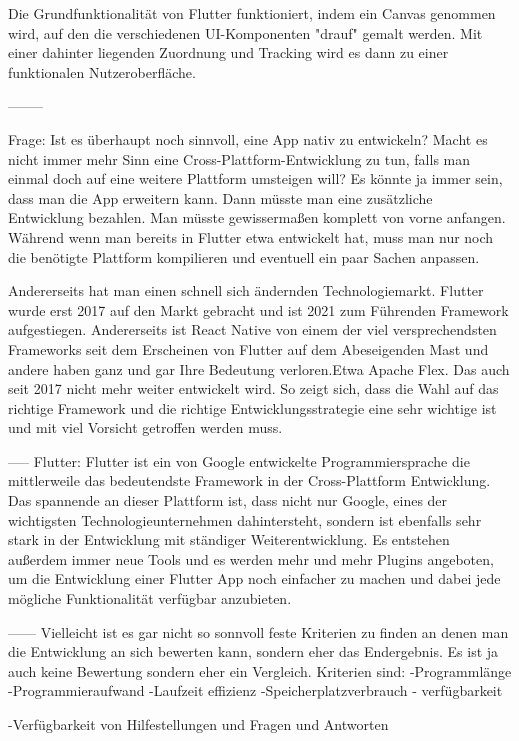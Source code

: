 Die Grundfunktionalität von Flutter funktioniert, indem ein Canvas genommen wird, auf den die verschiedenen UI-Komponenten "drauf" gemalt werden. Mit einer dahinter liegenden Zuordnung und Tracking wird es dann zu einer funktionalen Nutzeroberfläche.

--------

Frage: Ist es überhaupt noch sinnvoll, eine App nativ zu entwickeln? Macht es nicht immer mehr Sinn eine Cross-Plattform-Entwicklung zu tun, falls man einmal doch auf eine weitere Plattform umsteigen will? 
Es könnte ja immer sein, dass man die App erweitern kann. Dann müsste man eine zusätzliche Entwicklung bezahlen. Man müsste gewissermaßen komplett von vorne anfangen. Während wenn man bereits in Flutter etwa entwickelt hat, muss man nur noch die benötigte Plattform kompilieren und eventuell ein paar Sachen anpassen. 

Andererseits hat man einen schnell sich ändernden Technologiemarkt. Flutter wurde erst 2017 auf den Markt gebracht und ist 2021 zum Führenden Framework aufgestiegen. Andererseits ist React Native von einem der viel versprechendsten Frameworks seit dem Erscheinen von Flutter auf dem Abeseigenden Mast und andere haben ganz und gar Ihre Bedeutung verloren.Etwa Apache Flex. Das auch seit 2017 nicht mehr weiter entwickelt wird. So zeigt sich, dass die Wahl auf das richtige Framework und die richtige Entwicklungsstrategie eine sehr wichtige ist und mit viel Vorsicht getroffen werden muss.

-----
Flutter:
Flutter ist ein von Google entwickelte Programmiersprache die mittlerweile das bedeutendste Framework in der Cross-Plattform Entwicklung. Das spannende an dieser Plattform ist, dass nicht nur Google, eines der wichtigsten Technologieunternehmen dahintersteht, sondern ist ebenfalls sehr stark in der Entwicklung mit ständiger Weiterentwicklung. Es entstehen außerdem immer neue Tools und es werden mehr und mehr Plugins angeboten, um die Entwicklung einer Flutter App noch einfacher zu machen und dabei jede mögliche Funktionalität verfügbar anzubieten.

------
Vielleicht ist es gar nicht so sonnvoll feste Kriterien zu finden an denen man die Entwicklung an sich bewerten kann, sondern eher das Endergebnis. Es ist ja auch keine Bewertung sondern eher ein Vergleich.
Kriterien sind:
-Programmlänge
-Programmieraufwand
-Laufzeit effizienz
-Speicherplatzverbrauch
- verfügbarkeit

-Verfügbarkeit von Hilfestellungen und Fragen und Antworten

